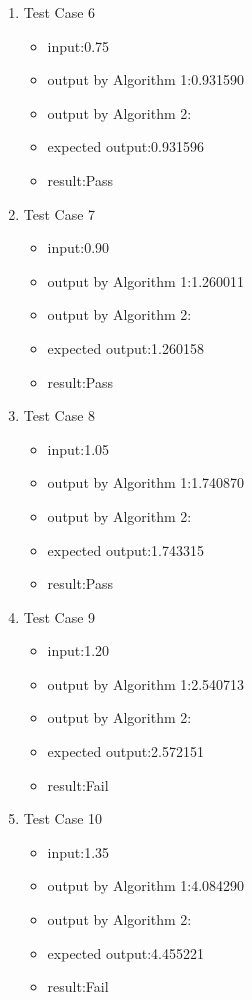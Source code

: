 \documentclass[10pt,a4paper,twoside]{article}
\begin{document}
\begin{enumerate}
\item 
Test Case 6
\begin{itemize}
    \item input:0.75
    \item output by Algorithm 1:0.931590
    \item output by Algorithm 2:
    \item expected output:0.931596
    \item result:Pass
\end{itemize}
\item 
Test Case 7
\begin{itemize}
    \item input:0.90
    \item output by Algorithm 1:1.260011
    \item output by Algorithm 2:
    \item expected output:1.260158
    \item result:Pass
\end{itemize}
\item 
Test Case 8
\begin{itemize}
    \item input:1.05
    \item output by Algorithm 1:1.740870
    \item output by Algorithm 2:
    \item expected output:1.743315
    \item result:Pass
\end{itemize}
\item 
Test Case 9
\begin{itemize}
    \item input:1.20
    \item output by Algorithm 1:2.540713
    \item output by Algorithm 2:
    \item expected output:2.572151
    \item result:Fail
\end{itemize}
\item 
Test Case 10
\begin{itemize}
    \item input:1.35
    \item output by Algorithm 1:4.084290
    \item output by Algorithm 2:
    \item expected output:4.455221
    \item result:Fail
\end{itemize}

\end{enumerate}
\end{document}
